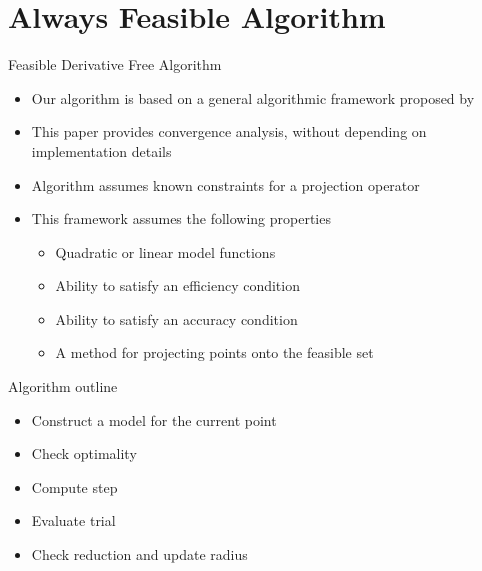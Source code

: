 \documentclass{beamer}
\begin{document}

\section{Always Feasible Algorithm}


\begin{frame}{Feasible Derivative Free Algorithm}
    \begin{itemize}
        \item Our algorithm is based on a general algorithmic framework proposed by \cite{CONEJO2013324}
        \item This paper provides convergence analysis, without depending on implementation details
		\item Algorithm assumes known constraints for a projection operator
        \item This framework assumes the following properties
            \begin{itemize}
				\item Quadratic or linear model functions
                \item Ability to satisfy an efficiency condition
                \item Ability to satisfy an accuracy condition
                \item A method for projecting points onto the feasible set
            \end{itemize}
    \end{itemize}
\end{frame}


\begin{frame}{Algorithm outline}
	\begin{itemize}
		\item Construct a model for the current point
		\item Check optimality
		\item Compute step
		\item Evaluate trial
		\item Check reduction and update radius
	\end{itemize}
\end{frame}
\end{document}
